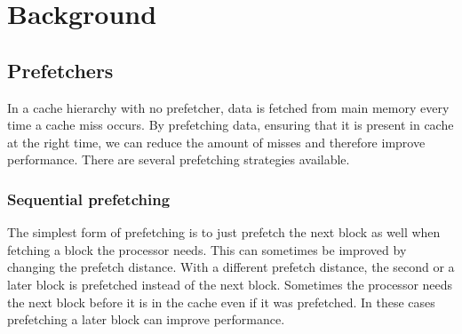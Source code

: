 \section{Background}
\label{sec:background}
\subsection{Prefetchers}


In a cache hierarchy with no prefetcher, data is fetched from main memory every time a cache miss occurs.
By prefetching data, ensuring that it is present in cache at the right time, we can reduce the amount of misses and therefore improve performance.
There are several prefetching strategies available.

\subsubsection{Sequential prefetching}

The simplest form of prefetching is to just prefetch the next block
as well when fetching a block the processor needs. This can
sometimes be improved by changing the prefetch distance. With a
different prefetch distance, the second or a later block is
prefetched instead of the next block.
Sometimes the processor needs the next block before it is in
the cache even if it was prefetched. In these cases prefetching a
later block can improve performance.

